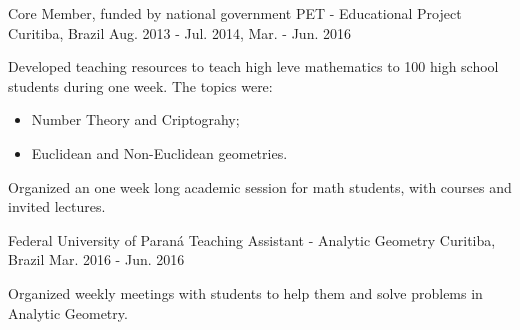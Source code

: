 

\begin{cventries}

  \cventry
    {Core Member, funded by national government} %
    {PET - Educational Project} %
    {Curitiba, Brazil} %
    {Aug. 2013 - Jul. 2014, Mar. - Jun. 2016} %
    {
      \begin{cvitems} %
        \item {Developed teaching resources to teach high leve mathematics
        to 100 high school students during one week. The topics were:
        \begin{itemize}
          \item Number Theory and Criptograhy;
          \item Euclidean and Non-Euclidean geometries.
        \end{itemize}}
        \item {Organized an one week long academic session for math students,
        with courses and invited lectures.}
      \end{cvitems}
    }

  \cventry
    {Federal University of Paraná} %
    {Teaching Assistant - Analytic Geometry} %
    {Curitiba, Brazil} %
    {Mar. 2016 - Jun. 2016} %
    {
      \begin{cvitems} %
        \item {Organized weekly meetings with students to help them and solve
        problems in Analytic Geometry.}
      \end{cvitems}
    }

\end{cventries}
